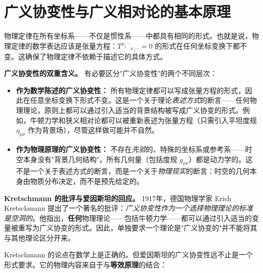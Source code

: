 \section{广义协变性与广义相对论的基本原理}

\begin{property}[广义协变性原理]
物理定律在所有坐标系——不仅是惯性系——中都具有相同的形式。也就是说，物理定律的数学表达应该是张量方程：$T^{\mu_1\cdots}{}_{\nu_1\cdots} = 0$ 的形式在任何坐标变换下都不变。这确保了物理定律不依赖于描述它的具体方式。
\end{property}

\medskip

\noindent\textbf{广义协变性的双重含义。} 有必要区分"广义协变性"的两个不同层次：

\begin{itemize}
    \item \textbf{作为数学陈述的广义协变性：} 所有物理定律都可以写成张量方程的形式，因此在任意坐标变换下形式不变。这是一个关于理论\textit{表述方式}的断言——任何物理理论，原则上都可以通过引入适当的背景结构被写成广义协变的形式。例如，牛顿力学和狭义相对论都可以被重新表述为张量方程（只需引入平坦度规 $\eta_{\mu\nu}$ 作为背景场），尽管这样做可能并不自然。
    
    \item \textbf{作为物理原理的广义协变性：} 不存在\textit{先验}的、特殊的坐标系或参考系——时空本身没有"背景几何结构"，所有几何量（包括度规 $g_{\mu\nu}$）都是动力学的。这不是一个关于表述方式的断言，而是一个关于\textit{物理现实}的断言：时空的几何本身由物质分布决定，而不是预先给定的。
\end{itemize}

\medskip

\noindent\textbf{Kretschmann 的批评与爱因斯坦的回应。} 1917年，德国物理学家 Erich Kretschmann 提出了一个著名的批评：\textit{广义协变性作为一个选择物理理论的标准是空洞的}。他指出，\textbf{任何}物理理论——包括牛顿力学——都可以通过引入适当的变量被重写为广义协变的形式。因此，单独要求一个理论是"广义协变的"并不能将其与其他理论区分开来。

Kretschmann 的论点在数学上是正确的。但爱因斯坦的广义协变性远不止是一个形式要求。它的物理内容来自于与\textbf{等效原理}的结合：

\begin{center}
\end{center}

